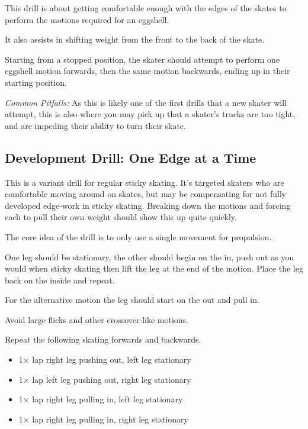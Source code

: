 This drill is about getting comfortable enough with the edges of the skates to perform the motions required for an eggshell.   

It also assists in shifting weight from the front to the back of the skate. 

Starting from a stopped position, the skater should attempt to perform one eggshell motion forwards, then the same motion backwards, ending up in their starting position.  


{\it Common Pitfalls:} As this is likely one of the first drills that a new skater will attempt, this is also where you may pick up that a skater's trucks are too tight, and are impeding their ability to turn their skate. 
 
\subsection*{Development Drill: One Edge at a Time}
\label{drill:sticky/eggshells/one_edge}

This is a variant drill for regular sticky skating. 
It's targeted skaters who are comfortable moving around on skates, but may be compensating for not fully developed edge-work in sticky skating.
Breaking down the motions and forcing each to pull their own weight should show this up quite quickly.

The core idea of the drill is to only use a single movement for propulsion.  

One leg should be stationary, the other should begin on the in, push out as you would when sticky skating then lift the leg at the end of the motion.  
Place the leg back on the inside and repeat. 

For the alternative motion the leg should start on the out and pull in.   

Avoid large flicks and other crossover-like motions.    

Repeat the following skating forwards and backwards. 
\begin{itemize}
    \item 1$\times$ lap right leg pushing out, left leg stationary  
    \item 1$\times$ lap left leg pushing out, right leg stationary 
    \item 1$\times$ lap right leg pulling in, left leg stationary 
    \item 1$\times$ lap right leg pulling in, right leg stationary 
\end{itemize}

